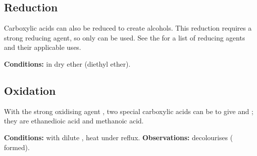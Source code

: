 
		\pagebreak
		\subsection{Reduction}

			Carboxylic acids can also be reduced to create alcohols. This reduction requires a strong reducing agent, so only
			 can be used. See the \hyperlink{AppendixReducingAgents}{} for a list of reducing agents
			and their applicable uses.

			\vspace{1.5em}
			\vbox{\textbf{Conditions:}\tabto{35mm} in dry ether (diethyl ether).}




		\subsection{Oxidation}

			With the strong oxidising agent , two special carboxylic acids can be  to give 
			and ; they are ethanedioic acid and methanoic acid.


			\vspace{1.5em}
			\vbox{\textbf{Conditions:}	\tabto{35mm} with dilute ,
										\tabto{35mm}heat under reflux.}
			\vspace{0.75em}
			\vbox{\textbf{Observations:}\tabto{35mm}  decolourises ( formed).}
















